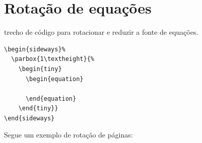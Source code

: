 \section{Rotação de equações}

trecho de código para rotacionar e reduzir a fonte de equações. 

\begin{verbatim}
\begin{sideways}%
  \parbox{1\textheight}{%
    \begin{tiny}
      \begin{equation}

      \end{equation}
    \end{tiny}}
\end{sideways}
\end{verbatim}

Segue um exemplo de rotação de páginas: \newpage

